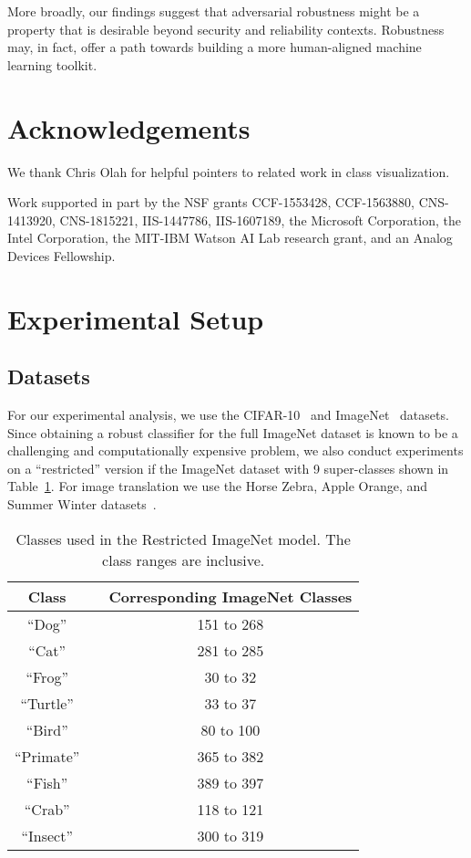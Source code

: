 \documentclass{article}
\newcommand{\HtoZ}{Horse  Zebra}
\newcommand{\StoW}{Summer  Winter}
\newcommand{\AtoO}{Apple  Orange}
\begin{document}
{More broadly, our findings suggest that adversarial robustness might be a
property that is desirable beyond security and reliability contexts. Robustness
may, in fact, offer a path towards building a more human-aligned machine
learning toolkit.
 
\section*{Acknowledgements}
We thank Chris Olah for helpful pointers to related work in class visualization.

Work supported in part by the NSF grants CCF-1553428, CCF-1563880,
CNS-1413920, CNS-1815221, IIS-1447786, IIS-1607189, the Microsoft Corporation, the Intel Corporation,
the MIT-IBM Watson AI Lab research grant, and an Analog Devices Fellowship.
 
\printbibliography


\clearpage

\appendix
\section{Experimental Setup}
\label{app:setup}
\subsection{Datasets}
\label{sec:dss}
For our experimental analysis, we use the CIFAR-10~\cite{krizhevsky2009learning} 
and ImageNet~\cite{russakovsky2015imagenet} datasets. Since obtaining a robust
classifier for the full ImageNet dataset is known to be a challenging and
computationally expensive problem, we also conduct experiments 
on a  ``restricted'' version if the ImageNet dataset with 9 super-classes 
shown in Table~\ref{tab:classes}. For image translation we use the
{\HtoZ}, {\AtoO}, and {\StoW} datasets~\cite{zhu2017unpaired}.

\begin{table}[!h]
	\caption{Classes used in the Restricted ImageNet model. The class ranges are
		inclusive.}
	\begin{center}
		\begin{tabular}{ccc}
			\toprule
			\textbf{Class} & \phantom{x} & \textbf{Corresponding ImageNet Classes} \\
			\midrule
			``Dog'' &&   151  to 268    \\ 
			``Cat'' &&   281  to 285    \\
			``Frog'' &&   30  to 32    \\
			``Turtle'' &&   33  to 37    \\
			``Bird'' &&   80  to 100    \\
			``Primate'' &&   365  to 382    \\
			``Fish'' &&   389  to 397    \\
			``Crab'' &&   118  to 121    \\
			``Insect'' &&   300  to 319    \\
			\bottomrule
		\end{tabular}
	\end{center}
	\label{tab:classes}
\end{table}

}
\end{document}

